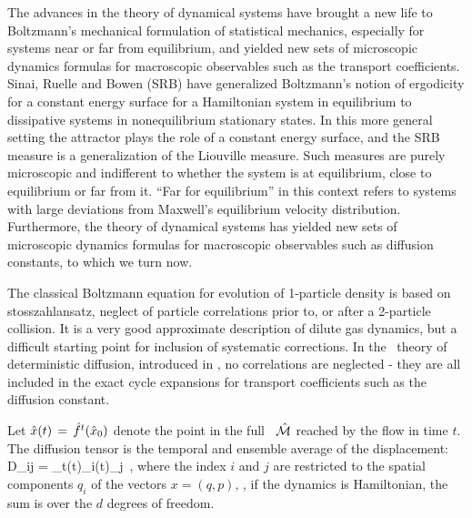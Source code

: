 


The advances in the theory of dynamical systems have brought a new life
to Boltzmann's mechanical formulation of statistical mechanics,
especially for systems near or far from equilibrium, and yielded new sets
of microscopic dynamics formulas for macroscopic observables such as the
transport coefficients. Sinai, Ruelle and Bowen (SRB) have generalized
Boltzmann's notion of ergodicity for a constant energy surface for a
Hamiltonian system in equilibrium to dissipative systems in
{nonequilibrium} stationary states. In this more
general setting the attractor plays the role of a constant energy
surface, and the SRB measure is a generalization of the Liouville
measure. Such measures are purely microscopic and indifferent to whether
the system is at equilibrium, close to equilibrium or far from it. ``Far
for equilibrium'' in this context refers to systems with large deviations
from Maxwell's equilibrium velocity distribution. Furthermore, the theory
of dynamical systems has yielded new sets of microscopic dynamics
formulas for macroscopic observables such as diffusion constants, to
which we turn now.

The classical Boltzmann equation for evolution of 1-particle density is
based on stosszahlansatz, neglect of particle correlations prior to, or
after a 2-particle collision. It is a very good approximate description
of dilute gas dynamics, but a difficult starting point for inclusion of
systematic corrections. In the \po\ theory of deterministic diffusion,
introduced in , no correlations are
neglected - they are all included in the exact cycle expansions for
transport coefficients such as the diffusion constant.

Let $\hat x(t)\,=\,{\hat{f}^{t}(\hat x_0)}$ denote the point in the full \statesp\
$\hat {{\cal M}}$ reached by the flow in time $t$. The diffusion tensor
is the temporal and ensemble average of the displacement:
\beq
D_{ij} =
\lim_{t\to\infty}\left\langle\hx(t)_i\hx(t)_j\right\rangle
\,,
\label{eq-diff-def}
\eeq
where the index $i$ and $j$ are restricted to the spatial components
$q_i$ of the {\statesp} vectors $x=(q,p)$, \ie, if the dynamics is
Hamiltonian, the sum is over the $d$ degrees of freedom.

